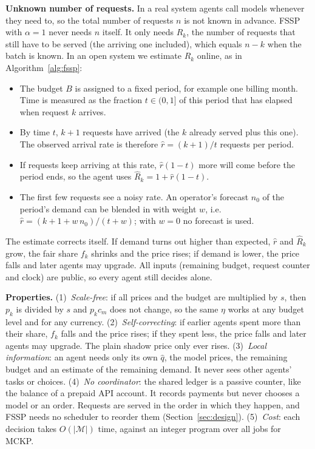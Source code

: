 \documentclass{article}
\begin{document}
\textbf{Unknown number of requests.}\label{sec:unknown-n} In a real system agents call models whenever they need to, so the total number of requests $n$ is not known in advance. FSSP with $\alpha=1$ never needs $n$ itself. It only needs $R_k$, the number of requests that still have to be served (the arriving one included), which equals $n-k$ when the batch is known. In an open system we estimate $R_k$ online, as in Algorithm~\ref{alg:fssp}:
\begin{itemize}[leftmargin=*, itemsep=1pt]
  \item The budget $B$ is assigned to a fixed period, for example one billing month. Time is measured as the fraction $t\in(0,1]$ of this period that has elapsed when request $k$ arrives.
  \item By time $t$, $k+1$ requests have arrived (the $k$ already served plus this one). The observed arrival rate is therefore $\hat r=(k+1)/t$ requests per period.
  \item If requests keep arriving at this rate, $\hat r(1-t)$ more will come before the period ends, so the agent uses $\hat R_k = 1+\hat r(1-t)$.
  \item The first few requests see a noisy rate. An operator's forecast $n_0$ of the period's demand can be blended in with weight $w$, i.e.\ $\hat r = (k+1+w\,n_0)/(t+w)$; with $w=0$ no forecast is used.
\end{itemize}
The estimate corrects itself. If demand turns out higher than expected, $\hat r$ and $\hat R_k$ grow, the fair share $f_k$ shrinks and the price rises; if demand is lower, the price falls and later agents may upgrade. All inputs (remaining budget, request counter and clock) are public, so every agent still decides alone.

\textbf{Properties.} (1)~\emph{Scale-free}: if all prices and the budget are multiplied by $s$, then $p_k$ is divided by $s$ and $p_k c_m$ does not change, so the same $\eta$ works at any budget level and for any currency. (2)~\emph{Self-correcting}: if earlier agents spent more than their share, $f_k$ falls and the price rises; if they spent less, the price falls and later agents may upgrade. The plain shadow price only ever rises. (3)~\emph{Local information}: an agent needs only its own $\hat q$, the model prices, the remaining budget and an estimate of the remaining demand. It never sees other agents' tasks or choices. (4)~\emph{No coordinator}: the shared ledger is a passive counter, like the balance of a prepaid API account. It records payments but never chooses a model or an order. Requests are served in the order in which they happen, and FSSP needs no scheduler to reorder them (Section~\ref{sec:design}). (5)~\emph{Cost}: each decision takes $O(|\mathcal{M}|)$ time, against an integer program over all jobs for MCKP.
\end{document}

